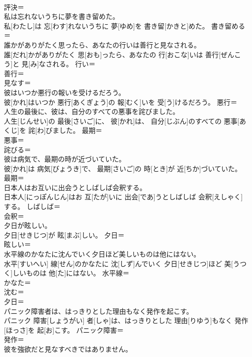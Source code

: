 \documentclass[8pt]{extreport}
\begin{document}
\begin{CJK}{UTF8}{min}
\\	評決＝ 
\\	私は忘れないうちに夢を書き留めた。	
\\	私[わたし]は 忘[わす]れないうちに 夢[ゆめ]を 書き留[かきと]めた。	書き留める＝ 
\\	誰かがありがたく思ったら、あなたの行いは善行と見なされる。	
\\	誰[だれ]かがありがたく 思[おも]ったら、あなたの 行[おこな]いは 善行[ぜんこう]と 見[み]なされる。	行い＝ 
\\	善行＝ 
\\	見なす＝ 
\\	彼はいつか悪行の報いを受けるだろう。	
\\	彼[かれ]はいつか 悪行[あくぎょう]の 報[むく]いを 受[う]けるだろう。	悪行＝ 
\\	人生の最後に、彼は、自分のすべての悪事を詫びました。	
\\	人生[じんせい]の 最後[さいご]に、 彼[かれ]は、 自分[じぶん]のすべての 悪事[あくじ]を 詫[わ]びました。	最期＝ 
\\	悪事＝ 
\\	詫びる＝ 
\\	彼は病気で、最期の時が近づいていた。	
\\	彼[かれ]は 病気[びょうき]で、 最期[さいご]の 時[とき]が 近[ちか]づいていた。	最期＝ 
\\	日本人はお互いに出会うとしばしば会釈する。	
\\	日本人[にっぽんじん]はお 互[たが]いに 出会[であ]うとしばしば 会釈[えしゃく]する。	しばしば＝ 
\\	会釈＝ 
\\	夕日が眩しい。	
\\	夕日[せきじつ]が 眩[まぶ]しい。	夕日＝ 
\\	眩しい＝ 
\\	水平線のかなたに沈んでいく夕日ほど美しいものは他にはない。	
\\	水平[すいへい] 線[せん]のかなたに 沈[しず]んでいく 夕日[せきじつ]ほど 美[うつく]しいものは 他[た]にはない。	水平線＝ 
\\	かなた＝ 
\\	沈む＝ 
\\	夕日＝ 
\\	パニック障害者は、はっきりとした理由もなく発作を起こす。	
\\	パニック 障害[しょうがい] 者[しゃ]は、はっきりとした 理由[りゆう]もなく 発作[ほっさ]を 起[お]こす。	パニック障害＝ 
\\	発作＝ 
\\	彼を強欲だと見なすべきではありません。	

\end{CJK}
\end{document}
